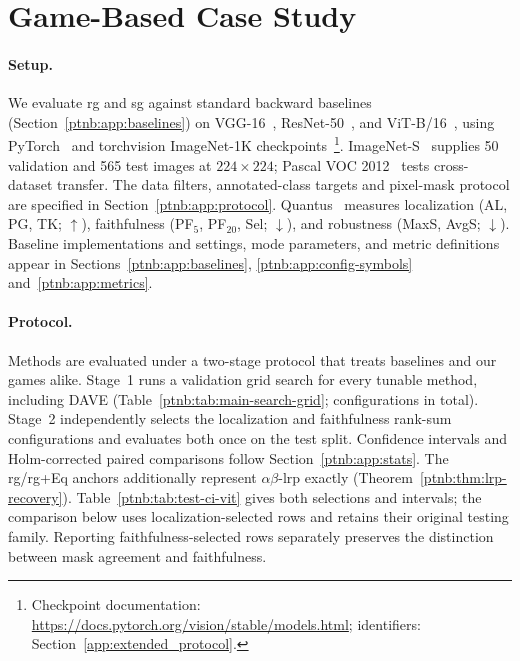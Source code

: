 



\section{Game-Based Case Study}\label{sec:results_vit}\label{sec:saliency_results}\label{ptnb:sec:experiments}\label{ptnb:sec:case-study}



\paragraph{Setup.}
We evaluate \ac{rg} and \ac{sg} against standard backward baselines (Section~\ref{ptnb:app:baselines}) on VGG-16~\parencite{Simonyan2015}, ResNet-50~\parencite{He2016resnet}, and ViT-B/16~\parencite{Dosovitskiy2021vit}, using PyTorch~\parencite{Paszke2019PyTorch} and torchvision ImageNet-1K checkpoints~\parencite{Deng2009,Russakovsky2015ilsvrc}\footnote{Checkpoint documentation: \url{https://docs.pytorch.org/vision/stable/models.html}; identifiers: Section~\ref{app:extended_protocol}.}. ImageNet-S~\parencite{gao2022luss} supplies 50 validation and 565 test images at $224{\times}224$; Pascal VOC 2012~\parencite{Everingham2010voc} tests cross-dataset transfer. The data filters, annotated-class targets and pixel-mask protocol are specified in Section~\ref{ptnb:app:protocol}. Quantus~\parencite{Hedstrom2023} measures localization (AL, PG, TK; $\uparrow$), faithfulness (PF$_5$, PF$_{20}$, Sel; $\downarrow$), and robustness (MaxS, AvgS; $\downarrow$). Baseline implementations and settings, mode parameters, and metric definitions appear in Sections~\ref{ptnb:app:baselines}, \ref{ptnb:app:config-symbols} and~\ref{ptnb:app:metrics}.

\paragraph{Protocol.}
Methods are evaluated under a two-stage protocol that treats baselines and our games alike. Stage~1 runs a validation grid search for every tunable method, including DAVE (Table~\ref{ptnb:tab:main-search-grid}; \nValGrid{} configurations in total). Stage~2 independently selects the localization and faithfulness rank-sum configurations and evaluates both once on the test split. Confidence intervals and Holm-corrected paired comparisons follow Section~\ref{ptnb:app:stats}. The \ac{rg}/\ac{rg}+Eq anchors additionally represent $\alpha\beta$-\ac{lrp} exactly (Theorem~\ref{ptnb:thm:lrp-recovery}). Table~\ref{ptnb:tab:test-ci-vit} gives both selections and intervals; the comparison below uses localization-selected rows and retains their original testing family. Reporting faithfulness-selected rows separately preserves the distinction between mask agreement and faithfulness.

